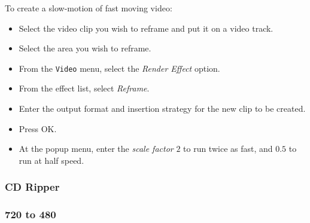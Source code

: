 To create a slow-motion of fast moving video:

\begin{itemize}
    \item Select the video clip you wish to reframe and put it on a video track.
    \item Select the area you wish to reframe.
    \item From the \texttt{Video} menu, select the \textit{Render Effect} option.
    \item From the effect list, select \textit{Reframe}.
    \item Enter the output format and insertion strategy for the new clip to be created.
    \item Press OK.
    \item At the popup menu, enter the \textit{scale factor} $2$ to run twice as fast, and $0.5$ to run at half speed.
\end{itemize}

\subsubsection*{CD Ripper}%
\label{ssub:cd_ripper}

\subsubsection*{720 to 480}%
\label{ssub:720_to_480}


